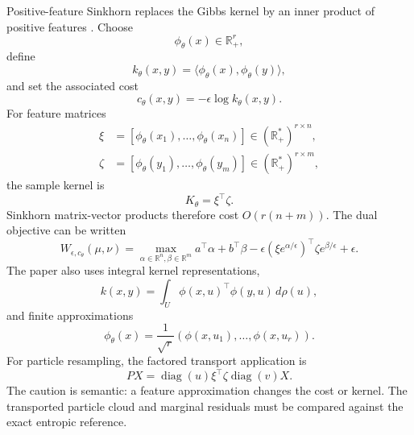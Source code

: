 \documentclass[11pt]{article}
\newcommand{\R}{\mathbb{R}}
\newcommand{\diag}{\operatorname{diag}}
\begin{document}
Positive-feature Sinkhorn replaces the Gibbs kernel by an inner product of
positive features \citep{scetbon2020positivefeatures}.  Choose
\begin{equation}
\phi_\theta(x)\in\R^r_{+},
\label{eq:positive-feature-map}
\end{equation}
define
\begin{equation}
k_\theta(x,y)
=
\langle\phi_\theta(x),\phi_\theta(y)\rangle,
\label{eq:positive-feature-kernel}
\end{equation}
and set the associated cost
\begin{equation}
c_\theta(x,y)
=
-\epsilon\log k_\theta(x,y).
\label{eq:positive-feature-cost}
\end{equation}
For feature matrices
\begin{align}
\xi
&=
[\phi_\theta(x_1),\ldots,\phi_\theta(x_n)]
\in(\R_+^\ast)^{r\times n},
\label{eq:positive-xi}\\
\zeta
&=
[\phi_\theta(y_1),\ldots,\phi_\theta(y_m)]
\in(\R_+^\ast)^{r\times m},
\label{eq:positive-zeta}
\end{align}
the sample kernel is
\begin{equation}
K_\theta
=
\xi^\top\zeta.
\label{eq:positive-feature-factorization}
\end{equation}
Sinkhorn matrix-vector products therefore cost $O(r(n+m))$.  The dual
objective can be written
\begin{equation}
W_{\epsilon,c_\theta}(\mu,\nu)
=
\max_{\alpha\in\R^n,\beta\in\R^m}
a^\top\alpha+b^\top\beta
-\epsilon(\xi e^{\alpha/\epsilon})^\top
\zeta e^{\beta/\epsilon}
+\epsilon.
\label{eq:positive-feature-dual}
\end{equation}
The paper also uses integral kernel representations,
\begin{equation}
k(x,y)
=
\int_U \phi(x,u)^\top\phi(y,u)\,d\rho(u),
\label{eq:positive-feature-integral}
\end{equation}
and finite approximations
\begin{equation}
\phi_\theta(x)
=
\frac{1}{\sqrt r}
(\phi(x,u_1),\ldots,\phi(x,u_r)).
\label{eq:positive-feature-finite}
\end{equation}
For particle resampling, the factored transport application is
\begin{equation}
P X
=
\diag(u)\xi^\top\zeta\diag(v)X.
\label{eq:positive-feature-transport}
\end{equation}
The caution is semantic: a feature approximation changes the cost or kernel.
The transported particle cloud and marginal residuals must be compared against
the exact entropic reference.
\end{document}
